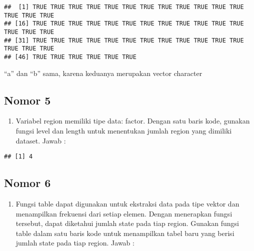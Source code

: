 \documentclass[
]{article}
\newenvironment{Shaded}{\begin{snugshade}}{\end{snugshade}}
\newcommand{\FunctionTok}[1]{\textcolor[rgb]{0.00,0.00,0.00}{#1}}
\newcommand{\NormalTok}[1]{#1}
\newcommand{\SpecialCharTok}[1]{\textcolor[rgb]{0.00,0.00,0.00}{#1}}
\providecommand{\tightlist}{%
  \setlength{\itemsep}{0pt}\setlength{\parskip}{0pt}}
\begin{document}
\begin{verbatim}
##  [1] TRUE TRUE TRUE TRUE TRUE TRUE TRUE TRUE TRUE TRUE TRUE TRUE TRUE TRUE TRUE
## [16] TRUE TRUE TRUE TRUE TRUE TRUE TRUE TRUE TRUE TRUE TRUE TRUE TRUE TRUE TRUE
## [31] TRUE TRUE TRUE TRUE TRUE TRUE TRUE TRUE TRUE TRUE TRUE TRUE TRUE TRUE TRUE
## [46] TRUE TRUE TRUE TRUE TRUE TRUE
\end{verbatim}

``a'' dan ``b'' sama, karena keduanya merupakan vector character

\hypertarget{nomor-5}{%
\subsection{Nomor 5}\label{nomor-5}}

\begin{enumerate}
\def\labelenumi{\arabic{enumi}.}
\setcounter{enumi}{4}
\tightlist
\item
  Variabel region memiliki tipe data: factor. Dengan satu baris kode,
  gunakan fungsi level dan length untuk menentukan jumlah region yang
  dimiliki dataset. Jawab :
\end{enumerate}

\begin{Shaded}
\end{Shaded}

\begin{verbatim}
## [1] 4
\end{verbatim}

\hypertarget{nomor-6}{%
\subsection{Nomor 6}\label{nomor-6}}

\begin{enumerate}
\def\labelenumi{\arabic{enumi}.}
\setcounter{enumi}{5}
\tightlist
\item
  Fungsi table dapat digunakan untuk ekstraksi data pada tipe vektor dan
  menampilkan frekuensi dari setiap elemen. Dengan menerapkan fungsi
  tersebut, dapat diketahui jumlah state pada tiap region. Gunakan
  fungsi table dalam satu baris kode untuk menampilkan tabel baru yang
  berisi jumlah state pada tiap region. Jawab :
\end{enumerate}
\end{document}

